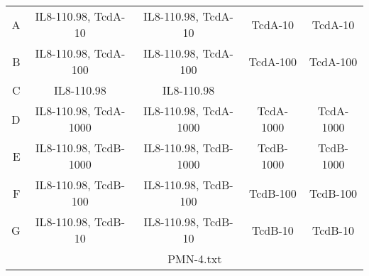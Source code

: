 \begin{adjustwidth}{0in}{3in}
{{\begin{tabular}{r|c|c|c|c|}
  \cline{2-5}\multirow{ 1 }{*}{ A } & IL8-110.98, TcdA-10 & IL8-110.98, TcdA-10 & TcdA-10 & TcdA-10 \\ 
  \cline{2-5}\multirow{ 1 }{*}{ B } & IL8-110.98, TcdA-100 & IL8-110.98, TcdA-100 & TcdA-100 & TcdA-100 \\ 
  \cline{2-5}\multirow{ 1 }{*}{ C } & IL8-110.98 & IL8-110.98 &  &  \\ 
  \cline{2-5}\multirow{ 1 }{*}{ D } & IL8-110.98, TcdA-1000 & IL8-110.98, TcdA-1000 & TcdA-1000 & TcdA-1000 \\ 
  \cline{2-5}\multirow{ 1 }{*}{ E } & IL8-110.98, TcdB-1000 & IL8-110.98, TcdB-1000 & TcdB-1000 & TcdB-1000 \\ 
  \cline{2-5}\multirow{ 1 }{*}{ F } & IL8-110.98, TcdB-100 & IL8-110.98, TcdB-100 & TcdB-100 & TcdB-100 \\ 
  \cline{2-5}\multirow{ 1 }{*}{ G } & IL8-110.98, TcdB-10 & IL8-110.98, TcdB-10 & TcdB-10 & TcdB-10 \\ 
   \cline{2-5} \multicolumn{1}{c}{} & \multicolumn{4}{c}{PMN-4.txt}\end{tabular}
}
}
\end{adjustwidth}
